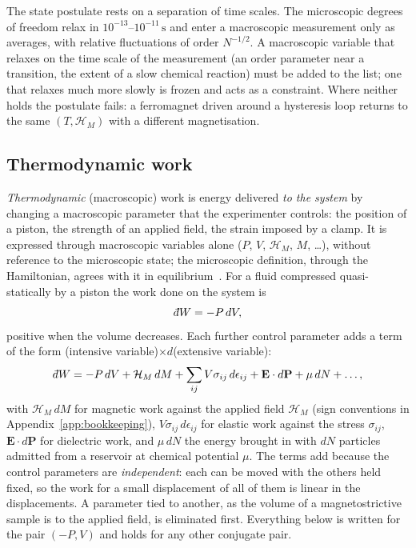 \documentclass[10pt,a4paper]{article}
\theoremstyle{remark}
\newcommand{\dbar}{\mathchar'26\mkern-11mu d}
\newcommand{\hmag}{\mathcal{H}_M}
\begin{document}
The state postulate rests on a separation of time scales. The microscopic
degrees of freedom relax in $10^{-13}$--$10^{-11}\,\mathrm{s}$ and enter a
macroscopic measurement only as averages, with relative fluctuations of order
$N^{-1/2}$. A macroscopic variable that relaxes on the time scale of the
measurement (an order parameter near a transition, the extent of a slow
chemical reaction) must be added to the list; one that relaxes much more
slowly is frozen and acts as a constraint. Where neither holds the postulate
fails: a ferromagnet driven around a hysteresis loop returns to the same
$(T,\hmag{})$ with a different magnetisation.

\subsection{Thermodynamic work}
\label{sec:work}

\emph{Thermodynamic} (macroscopic) work is energy delivered \emph{to the
system} by changing a macroscopic parameter that the experimenter controls: the
position of a piston, the strength of an applied field, the strain imposed by a
clamp. It is expressed through macroscopic variables alone ($P$, $V$,
$\hmag{}$, $M$, \dots), without reference to the microscopic state; the
microscopic definition, through the Hamiltonian, agrees with it in
equilibrium~\cite{ThermalNotes}. For a fluid
compressed quasi-statically by a piston the work done on the system is
\[
  \dbar W = -P\,dV ,
\]
positive when the volume decreases. Each further control parameter adds a term
of the form (intensive variable)$\times d$(extensive variable):
\[
  \dbar W = -P\,dV + \hmag{}\,dM + \sum_{ij}V\sigma_{ij}\,d\epsilon_{ij}
  + \mathbf{E}\cdot d\mathbf{P} + \mu\,dN + \dots ,
\]
with $\hmag{}\,dM$ for magnetic work against the applied field
$\hmag{}$ (sign conventions in Appendix~\ref{app:bookkeeping}), $V\sigma_{ij}\,d\epsilon_{ij}$ for
elastic work against the stress $\sigma_{ij}$, $\mathbf{E}\cdot d\mathbf{P}$
for dielectric work, and $\mu\,dN$ the energy brought in with $dN$ particles
admitted from a reservoir at chemical potential $\mu$. The terms add because
the control parameters are \emph{independent}: each can be moved with the
others held fixed, so the work for a small displacement of all of them is
linear in the displacements. A parameter tied to another, as the volume of a
magnetostrictive sample is to the applied field, is eliminated first.
Everything below is written for the pair $(-P,V)$ and holds for any other conjugate pair.
\end{document}
